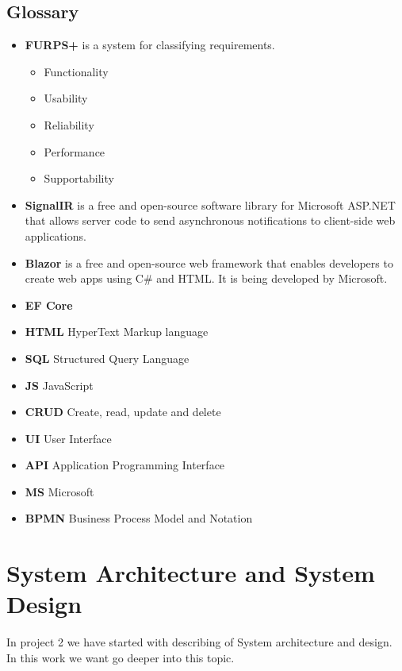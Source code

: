\documentclass{scrartcl}
\begin{document}
\subsection{Glossary}
\begin{itemize}


\item \textbf{FURPS+}\cite{eeles2005capturing} is a system for classifying requirements.
\begin{itemize}
\item Functionality
\item Usability
\item Reliability
\item Performance
\item Supportability 
\end{itemize}


\item \textbf{ SignalIR} is a free and open-source software library for Microsoft ASP.NET that allows server code to send asynchronous notifications to client-side web applications. 

\item \textbf{Blazor} is a free and open-source web framework that enables developers to create web apps using C\# and HTML. It is being developed by Microsoft.

\item \textbf{EF Core} 

\item \textbf{HTML} HyperText Markup language


\item \textbf{SQL} Structured Query Language
\item \textbf{JS } JavaScript
\item \textbf{CRUD} Create, read, update and delete
\item \textbf{UI} User Interface
\item \textbf{API} Application Programming Interface 

\item \textbf{MS} Microsoft
\item \textbf{BPMN} Business Process Model and Notation



\end{itemize}


\section{System Architecture and System Design}
In project 2 we have started with describing of System architecture and design. In this work we want go deeper into this topic. \\
\end{document}
